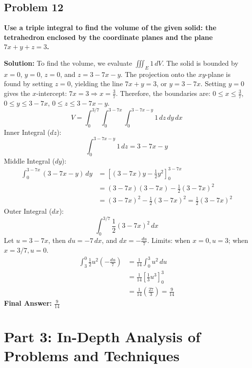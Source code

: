 \documentclass[12pt]{article}
\begin{document}
\vspace{0.5cm}
\subsection*{Problem 12}
\textbf{Use a triple integral to find the volume of the given solid: the tetrahedron enclosed by the coordinate planes and the plane $7x + y + z = 3$.}

\textbf{Solution:}
To find the volume, we evaluate $\iiint_E 1 \, dV$. 
The solid is bounded by $x=0$, $y=0$, $z=0$, and $z = 3 - 7x - y$. 
The projection onto the $xy$-plane is found by setting $z=0$, yielding the line $7x + y = 3$, or $y = 3 - 7x$. 
Setting $y=0$ gives the $x$-intercept: $7x = 3 \Rightarrow x = \frac{3}{7}$.
Therefore, the boundaries are:
$0 \le x \le \frac{3}{7}$, $0 \le y \le 3-7x$, $0 \le z \le 3-7x-y$.
\[ V = \int_{0}^{3/7} \int_{0}^{3-7x} \int_{0}^{3-7x-y} 1 \, dz \, dy \, dx \]
Inner Integral ($dz$):
\[ \int_{0}^{3-7x-y} 1 \, dz = 3 - 7x - y \]
Middle Integral ($dy$):
\begin{align*} 
\int_{0}^{3-7x} (3 - 7x - y) \, dy &= \left[ (3-7x)y - \frac{1}{2}y^2 \right]_{0}^{3-7x} \\
&= (3-7x)(3-7x) - \frac{1}{2}(3-7x)^2 \\
&= (3-7x)^2 - \frac{1}{2}(3-7x)^2 = \frac{1}{2}(3-7x)^2
\end{align*}
Outer Integral ($dx$):
\[ \int_{0}^{3/7} \frac{1}{2}(3-7x)^2 \, dx \]
Let $u = 3-7x$, then $du = -7 \, dx$, and $dx = -\frac{du}{7}$. 
Limits: when $x=0, u=3$; when $x=3/7, u=0$.
\begin{align*} 
\int_{3}^{0} \frac{1}{2}u^2 \left( -\frac{du}{7} \right) &= \frac{1}{14} \int_{0}^{3} u^2 \, du \\
&= \frac{1}{14} \left[ \frac{1}{3}u^3 \right]_{0}^{3} \\
&= \frac{1}{14} \left( \frac{27}{3} \right) = \frac{9}{14}
\end{align*}
\textbf{Final Answer:} $\frac{9}{14}$


\newpage
\section{Part 3: In-Depth Analysis of Problems and Techniques}
\end{document}
